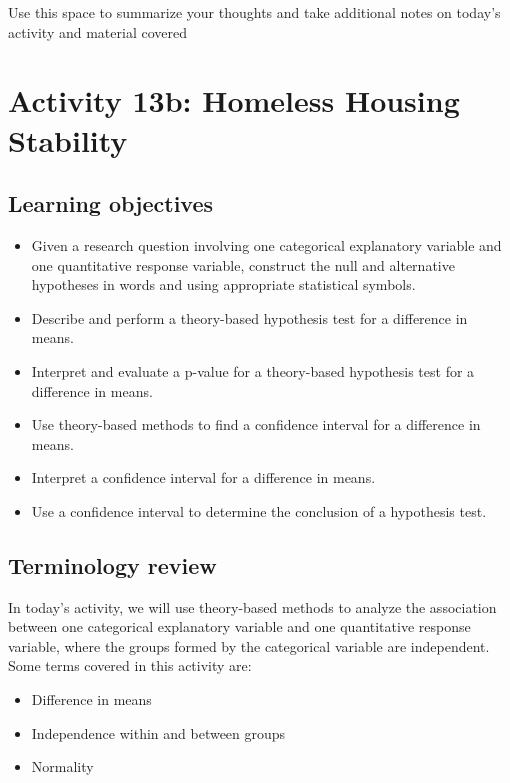 \documentclass[
]{report}
\begin{document}
Use this space to summarize your thoughts and take additional notes on today's activity and material covered

\newpage

\hypertarget{activity-13b-homeless-housing-stability}{%
\section{Activity 13b: Homeless Housing Stability}\label{activity-13b-homeless-housing-stability}}


\hypertarget{learning-objectives-20}{%
\subsection{Learning objectives}\label{learning-objectives-20}}

\begin{itemize}
\item
  Given a research question involving one categorical explanatory variable and one quantitative response variable, construct the null and alternative hypotheses
  in words and using appropriate statistical symbols.
\item
  Describe and perform a theory-based hypothesis test for a difference in means.
\item
  Interpret and evaluate a p-value for a theory-based hypothesis test for a difference in means.
\item
  Use theory-based methods to find a confidence interval for a difference in means.
\item
  Interpret a confidence interval for a difference in means.
\item
  Use a confidence interval to determine the conclusion of a hypothesis test.
\end{itemize}

\hypertarget{terminology-review-22}{%
\subsection{Terminology review}\label{terminology-review-22}}

In today's activity, we will use theory-based methods to analyze the association between one categorical explanatory variable and one quantitative response variable, where the groups formed by the categorical variable are independent. Some terms covered in this activity are:

\begin{itemize}
\item
  Difference in means
\item
  Independence within and between groups
\item
  Normality
\end{itemize}
\end{document}
